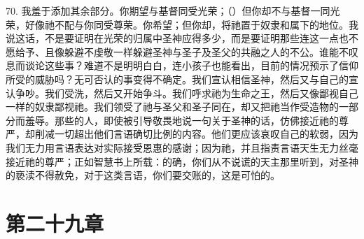 70. 我羞于添加其余部分。你期望与基督同受光荣；（）但你却不与基督一同光荣，好像祂不配与你同受尊荣。你希望；但你却，将祂置于奴隶和属下的地位。我说这话，不是要证明在光荣的归属中圣神应得多少，而是要证明那些连这一点也不愿给予、且像躲避不虔敬一样躲避圣神与圣子及圣父的共融之人的不公。谁能不叹息而谈论这些事？难道不是明明白白，连小孩子也能看出，目前的情况预示了信仰所受的威胁吗？无可否认的事变得不确定。我们宣认相信圣神，然后又与自己的宣认争吵。我们受洗，然后又开始争斗。我们呼求祂为生命之王，然后又像鄙视自己一样的奴隶鄙视祂。我们领受了祂与圣父和圣子同在，却又把祂当作受造物的一部分而羞辱。那些的人，即使被引导敬畏地说一句关于圣神的话，仿佛接近祂的尊严，却削减一切超出他们言语确切比例的内容。他们更应该哀叹自己的软弱，因为我们无力用言语表达对实际接受恩惠的感谢；因为祂，并且指责言语天生无力丝毫接近祂的尊严；正如智慧书上所载：的确，你们从不说谎的天主那里听到，对圣神的亵渎不得赦免，对于这类言语，你们要交账的，这是可怕的。\par


\section{第二十九章}

\par

